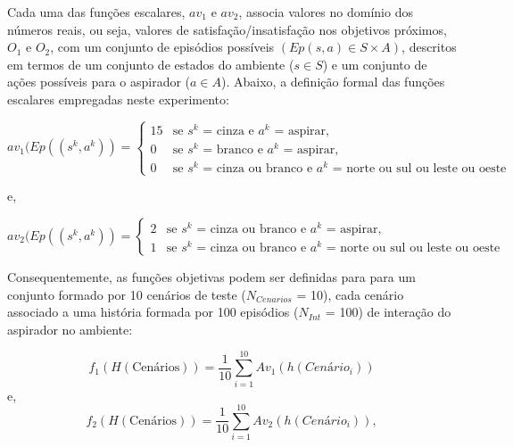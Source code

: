 \begin{table}[h!]   
    \centering
\end{table}
    
Cada uma das funções escalares, $av_1$ e $av_2$, associa valores no domínio dos números reais, ou seja, valores de satisfação/insatisfação nos objetivos próximos, $O_1$ e $O_2$, com um conjunto de episódios possíveis $(Ep(s,a) \in S\times A)$, descritos em termos de um conjunto de estados do ambiente ($s \in S$) e um conjunto de ações possíveis para o aspirador ($a \in A$). Abaixo, a definição formal das funções escalares empregadas neste experimento:

\[
av_1(Ep((s^k, a^k)) =
\begin{cases}
  15 & \text{se $s^k$ = cinza e $a^k$ = aspirar,}\\
  0 & \text{se $s^k$ = branco e $a^k$ = aspirar,}\\
  0 & \text{se $s^k$ = cinza ou branco e $a^k$ = norte ou sul ou leste ou oeste}
\end{cases}
\]

e, 

\[
av_2(Ep((s^k, a^k)) =
\begin{cases}
  2 & \text{se $s^k$ = cinza ou branco e $a^k$ = aspirar,}\\
  1 & \text{se $s^k$ = cinza ou branco e $a^k$ = norte ou sul ou leste ou oeste}
\end{cases}
\]

Consequentemente, as funções objetivas podem ser definidas para para um conjunto formado por 10 cenários de teste ($N_{Cenarios}$ = 10), cada cenário associado a uma história formada por 100 episódios ($N_{Int}$ = 100) de interação do aspirador no ambiente:

\[
    f_1(H(\textrm{Cenários}))=\frac{1}{10}\sum_{i=1}^{10}Av_1(h(Cenário_i))
\]
e,
\[
    f_2(H(\textrm{Cenários}))=\frac{1}{10}\sum_{i=1}^{10}Av_2(h(Cenário_i)),
\]

